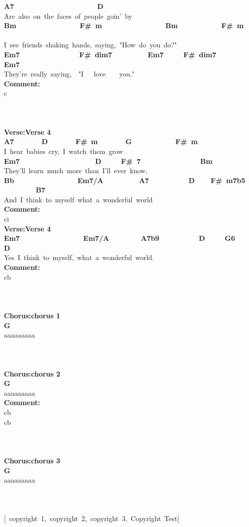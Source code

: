 \documentclass{scrartcl}
\begin{document}
{\textbf{ \hspace*{4em}A7~~~~~~~~~~~~~~~~~~~~~D~~~~~~~~~~~~~~~} \\
Are~also~on~the~faces~of~people~goin'~by \\
\textbf{ \hspace*{6em}Bm~~~~~~~~~~~~~~~~F\#~m~~~~~~~~~~~~~~~~Bm~~~~~~~~~~~F\#~m~~~~} \\
I~see~friends~shaking~hands,~saying,~"How~do~you~do?" \\
\textbf{ Em7~~~~~~~~~~~~~~~F\#~dim7~~~~~~~~~Em7~~~~~F\#~dim7~~~~~~~~Em7~~~~~~~~} \\
They're~really~saying,~~"I~~~love~~~~you."~~~ \\
\textbf{Comment:} \\
c \\
 \\
\textbf{ } \\
 \\
\textbf{Verse:Verse 4} \\
\textbf{ A7~~~~~~~D~~~~~~~F\#~m~~~~~~~G~~~~~~~~~~~F\#~m~~~~} \\
I~hear~babies~cry,~I~watch~them~grow \\
\textbf{ Em7~~~~~~~~~~~~~~~~~~~D~~~~~F\#~7~~~~~~~~~~~~~~~Bm~~~~~} \\
They'll~learn~much~more~than~I'll~ever~know, \\
\textbf{ \hspace*{6em}Bb~~~~~~~~~~~~~~~~Em7/A~~~~~~~~~A7~~~~~~~~~~D~~~~F\#~m7b5~~~~~~~~~B7~~} \\
And~I~think~to~myself~what~a~wonderful~world~~~~~~~~~~~~ \\
\textbf{Comment:} \\
ci \\
\textbf{Verse:Verse 4} \\
\textbf{ \hspace*{6em}Em7~~~~~~~~~~~~~~~~Em7/A~~~~~~~~A7b9~~~~~~~~~~D~~~~~G6~~~~D~} \\
Yes~I~think~to~myself,~what~a~wonderful~world.~~~~ \\
\textbf{Comment:} \\
cb \\
 \\
\textbf{ } \\
 \\
\textbf{Chorus:chorus 1} \\
\textbf{ \hspace*{8em}G~} \\
aaaaaaaaa \\
 \\
\textbf{ } \\
 \\
\textbf{Chorus:chorus 2} \\
\textbf{ \hspace*{8em}G~} \\
aaaaaaaaa \\
\textbf{Comment:} \\
cb \\
cb \\
 \\
\textbf{ } \\
 \\
\textbf{Chorus:chorus 3} \\
\textbf{ \hspace*{8em}G~} \\
aaaaaaaaa \\
 \\
\textbf{ } \\
 \\
{[}~copyright~1,~copyright~2,~copyright~3,~Copyright~Test{]}~
}
\end{document}
